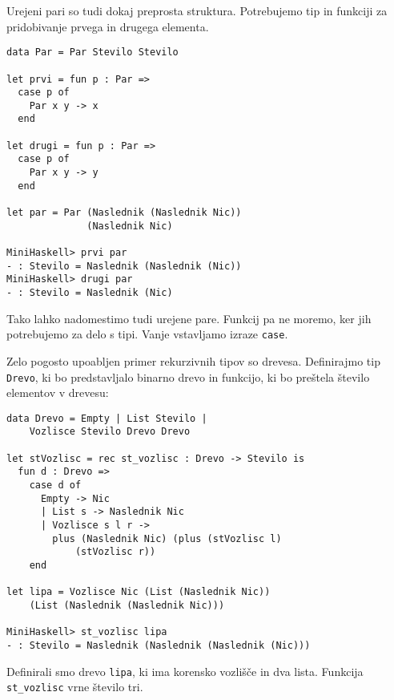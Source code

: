 \documentclass[12pt,a4paper,openany]{book}
\begin{document}
Urejeni pari so tudi dokaj preprosta struktura. Potrebujemo tip in funkciji za pridobivanje prvega in drugega elementa.
\begin{lstlisting}
data Par = Par Stevilo Stevilo

let prvi = fun p : Par =>
  case p of 
    Par x y -> x
  end

let drugi = fun p : Par =>
  case p of 
    Par x y -> y
  end

let par = Par (Naslednik (Naslednik Nic)) 
              (Naslednik Nic)

MiniHaskell> prvi par
- : Stevilo = Naslednik (Naslednik (Nic))
MiniHaskell> drugi par
- : Stevilo = Naslednik (Nic)
\end{lstlisting}
Tako lahko nadomestimo tudi urejene pare. Funkcij pa ne moremo, ker jih potrebujemo za delo s tipi. Vanje vstavljamo izraze \lstinline{case}. 

Zelo pogosto upoabljen primer rekurzivnih tipov so drevesa. Definirajmo tip \lstinline{Drevo}, ki bo predstavljalo binarno drevo in funkcijo, ki bo preštela število elementov v drevesu:
\begin{lstlisting}	
data Drevo = Empty | List Stevilo | 
    Vozlisce Stevilo Drevo Drevo

let stVozlisc = rec st_vozlisc : Drevo -> Stevilo is
  fun d : Drevo =>
    case d of
      Empty -> Nic
      | List s -> Naslednik Nic
      | Vozlisce s l r ->
        plus (Naslednik Nic) (plus (stVozlisc l) 
            (stVozlisc r))
    end

let lipa = Vozlisce Nic (List (Naslednik Nic)) 
    (List (Naslednik (Naslednik Nic)))

MiniHaskell> st_vozlisc lipa
- : Stevilo = Naslednik (Naslednik (Naslednik (Nic)))
\end{lstlisting}
Definirali smo drevo \lstinline{lipa}, ki ima korensko vozlišče in dva lista. Funkcija \lstinline{st_vozlisc} vrne število tri.
\end{document}

